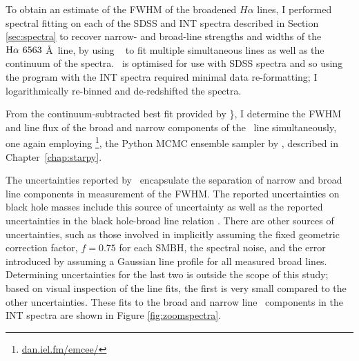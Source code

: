 To obtain an estimate of the FWHM of the broadened $H\alpha$ lines, I performed spectral fitting on each of the SDSS and INT spectra described in Section \ref{sec:spectra} to recover narrow- and broad-line strengths and widths of the $\mha\ 6563$ \AA\ line, by using \gandalf\ \citep{sarzi06} {\notebsm to fit multiple simultaneous lines as well as the continuum of the spectra}. \gandalf\ is optimised for use with SDSS spectra and so using the program with the INT spectra required minimal data re-formatting; I logarithmically re-binned and de-redshifted the spectra. {\notebsm From the continuum-subtracted best fit provided by \gandalf\}, I determine the FWHM and line flux of the broad and narrow components of the \ha\ line simultaneously, one again employing \emcee\footnote{\url{dan.iel.fm/emcee/}}, the Python MCMC ensemble sampler by \cite{emcee13}, described in Chapter~\ref{chap:starpy}. 

The uncertainties reported by \emcee\ encapsulate the separation of narrow and broad line components in measurement of the FWHM. The reported uncertainties on black hole masses include this source of uncertainty as well as the reported uncertainties in the black hole-broad line relation \citep{gh07a}. There are other sources of uncertainties, such as those involved in implicitly assuming the fixed geometric correction factor, $f=0.75$ \citep{netzer90} for each SMBH, the spectral noise, and the error introduced by assuming a Gaussian line profile for all measured broad lines. Determining uncertainties for the last two is outside the scope of this study; based on visual inspection of the line fits, the first is very small compared to the other uncertainties. These fits to the broad and narrow line \ha \ components in the INT spectra are shown in Figure \ref{fig:zoomspectra}.

}
